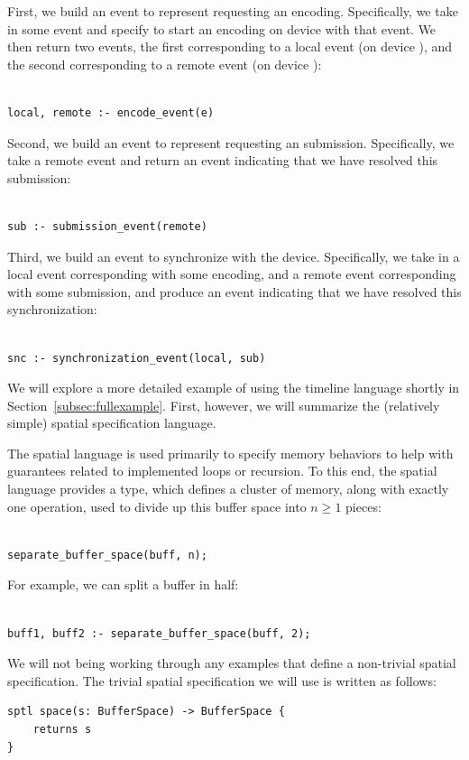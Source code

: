 First, we build an event to represent requesting an encoding.  Specifically, we take in some event and specify to start an encoding on device  with that event.  We then return two events, the first corresponding to a local event (on device ), and the second corresponding to a remote event (on device ):
%
\begin{lstlisting}

local, remote :- encode_event(e)
\end{lstlisting}
%
Second, we build an event to represent requesting an submission.  Specifically, we take a remote event and return an event indicating that we have resolved this submission:
%
\begin{lstlisting}

sub :- submission_event(remote)
\end{lstlisting}
%
Third, we build an event to synchronize with the device.  Specifically, we take in a local event corresponding with some encoding, and a remote event corresponding with some submission, and produce an event indicating that we have resolved this synchronization:
%
\begin{lstlisting}

snc :- synchronization_event(local, sub)
\end{lstlisting}
%
We will explore a more detailed example of using the timeline language shortly in Section~\ref{subsec:fullexample}.  First, however, we will summarize the (relatively simple) spatial specification language.

The spatial language is used primarily to specify memory behaviors to help with guarantees related to implemented loops or recursion.  To this end, the spatial language provides a  type, which defines a cluster of memory, along with exactly one operation, used to divide up this buffer space  into $n\geq 1$ pieces:
%
\begin{lstlisting}

separate_buffer_space(buff, n);
\end{lstlisting}
%
For example, we can split a buffer in half:
%
\begin{lstlisting}
	
buff1, buff2 :- separate_buffer_space(buff, 2);
\end{lstlisting}
%
We will not being working through any examples that define a non-trivial spatial specification.  The trivial spatial specification we will use is written as follows:
%
\begin{lstlisting}
sptl space(s: BufferSpace) -> BufferSpace { 
	returns s 
}
\end{lstlisting}
%

